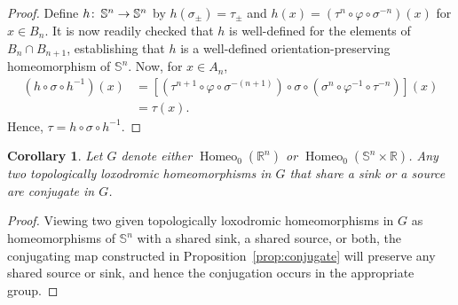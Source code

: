 \documentclass[microtype]{gtpart}
\newcommand{\br}{\mathbb{R}}
\newcommand{\vp}{\varphi}
\DeclareMathOperator{\Homeo}{Homeo}
\renewcommand{\co}{\colon\thinspace}
\newtheorem{Cor}[Thm]{Corollary}
\theoremstyle{definition}
\numberwithin{equation}{section}
\newcommand{\nv}[1]{\color{Cerulean}  \{NV: #1\}\color{black}}
\begin{document}
\begin{proof}

Define \( h \co \mathbb S^n \to \mathbb S^n \) by \( h(\sigma_\pm) = \tau_\pm \) and \( h(x) = (\tau^n \circ \vp \circ \sigma^{-n}) (x) \) for \( x \in B_n \).
It is now readily checked that \( h \) is well-defined for the elements of \( B_n \cap B_{n+1} \), establishing that \( h \) is a well-defined orientation-preserving homeomorphism of \( \mathbb S^n \).
Now, for \( x \in A_n \),
\begin{align*}
(h\circ \sigma \circ h^{-1})(x) &= \left[(\tau^{n+1}\circ \vp \circ \sigma^{-(n+1)})\circ \sigma \circ (\sigma^n \circ \vp^{-1} \circ \tau^{-n})\right](x)\\
	&= \tau(x).
\end{align*}
Hence, \( \tau = h \circ \sigma \circ h^{-1} \).
\end{proof}

\begin{Cor}
\label{cor:conjugate}
Let \( G \) denote either \( \Homeo_0(\br^n) \) or \( \Homeo_0(\mathbb S^n \times \br) \).
Any two topologically loxodromic homeomorphisms in \( G \) that share a sink or a source are conjugate in \( G \).
\end{Cor}

\begin{proof}
Viewing two given topologically loxodromic homeomorphisms in \( G \) as homeomorphisms of \( \mathbb S^n \) with a shared sink, a shared source, or both, the conjugating map constructed in Proposition~\ref{prop:conjugate} will preserve any shared source or sink, and hence the conjugation occurs in the appropriate group.
\end{proof}
\end{document}
